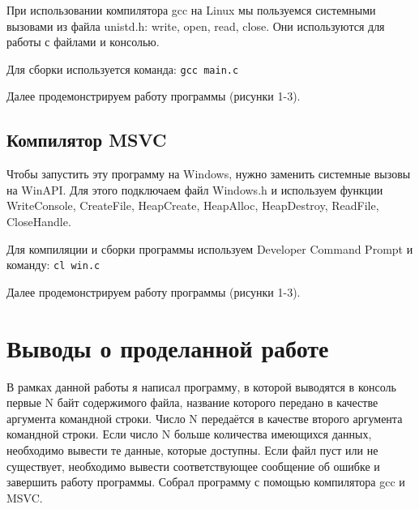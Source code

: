 При использовании компилятора gcc на Linux мы пользуемся системными вызовами из файла unistd.h: write, open, read, close. Они используются для работы с файлами и консолью.

Для сборки используется команда: \texttt{gcc main.c}

Далее продемонстрируем работу программы (рисунки 1-3).

\FloatBarrier


\subsection{Компилятор MSVC}

Чтобы запустить эту программу на Windows, нужно заменить системные вызовы на WinAPI. Для этого подключаем файл Windows.h и используем функции WriteConsole, CreateFile, HeapCreate, HeapAlloc, HeapDestroy, ReadFile, CloseHandle.

Для компиляции и сборки программы используем Developer Command Prompt и команду: \texttt{cl win.c}

Далее продемонстрируем работу программы (рисунки 1-3).

\FloatBarrier


\clearpage

\section{Выводы о проделанной работе}
В рамках данной работы я написал программу, в которой выводятся в консоль первые N байт содержимого файла, название которого передано в качестве аргумента командной строки. Число N передаётся в качестве второго аргумента командной строки. Если число N больше количества имеющихся данных, необходимо вывести те данные, которые доступны. Если файл пуст или не существует, необходимо вывести соответствующее сообщение об ошибке и завершить работу программы. Собрал программу с помощью компилятора gcc и MSVC.

\clearpage
